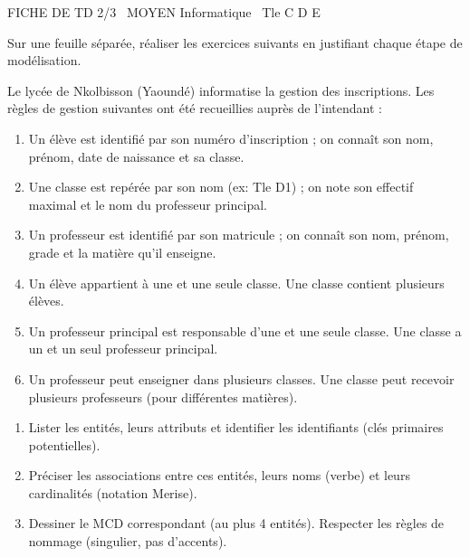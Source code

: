 \documentclass[11pt]{article}
\begin{document}
\begin{tcolorbox}[enhanced,colback=popink,colframe=popink,arc=10pt,boxrule=0pt,left=12pt,right=12pt,top=9pt,bottom=9pt]
{\color{white}\popxbold\small FICHE DE TD 2/3 \textbullet\ MOYEN \hfill Informatique \textbullet\ Tle C D E\par}
\end{tcolorbox}
\vspace{4pt}
\noindent Sur une feuille séparée, réaliser les exercices suivants en justifiant chaque étape de modélisation.

\begin{exercice}
Le lycée de Nkolbisson (Yaoundé) informatise la gestion des inscriptions. Les règles de gestion suivantes ont été recueillies auprès de l'intendant :
\begin{enumerate}
    \item Un élève est identifié par son numéro d'inscription ; on connaît son nom, prénom, date de naissance et sa classe.
    \item Une classe est repérée par son nom (ex: Tle D1) ; on note son effectif maximal et le nom du professeur principal.
    \item Un professeur est identifié par son matricule ; on connaît son nom, prénom, grade et la matière qu'il enseigne.
    \item Un élève appartient à une et une seule classe. Une classe contient plusieurs élèves.
    \item Un professeur principal est responsable d'une et une seule classe. Une classe a un et un seul professeur principal.
    \item Un professeur peut enseigner dans plusieurs classes. Une classe peut recevoir plusieurs professeurs (pour différentes matières).
\end{enumerate}
\begin{enumerate}
    \item Lister les entités, leurs attributs et identifier les identifiants (clés primaires potentielles).
    \item Préciser les associations entre ces entités, leurs noms (verbe) et leurs cardinalités (notation Merise).
    \item Dessiner le MCD correspondant (au plus 4 entités). Respecter les règles de nommage (singulier, pas d'accents).
\end{enumerate}
\end{exercice}
\end{document}
